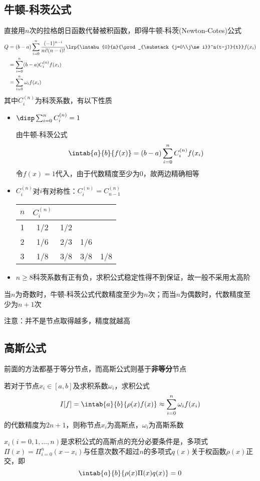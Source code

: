 \subsection{牛顿-科茨公式}
直接用$n$次的拉格朗日函数代替被积函数，即得牛顿-科茨(Newton-Cotes)公式
\[\begin{aligned}
    Q&=(b-a)\sum_{i=0}^n\frac{(-1)^{n-i}}{ni!(n-i)!}\lrp{\intabu{0}{n}{\prod_{\substack{j=0\\j\ne i}}^n(t-j)}{t}}f(x_i)\\
    &=\sum_{i=0}^n(b-a)C_i^{(n)} f(x_i)\\
    &=\sum_{i=0}^n\omega_if(x_i)
\end{aligned}\]
其中$C_i^{(n)}$为科茨系数，有以下性质
\begin{itemize}
    \item $\disp\sum_{i=0}^nC_{i}^{(n)}=1$
    \begin{analysis}
        由牛顿-科茨公式
        \[\intab{a}{b}{f(x)}=(b-a)\sum_{i=0}^nC_i^{(n)}f(x_i)\]
        令$f(x)=1$代入，由于代数精度至少为$0$，故两边精确相等
    \end{analysis}
    \item $C_i^{(n)}$对$i$有对称性：$C_i^{(n)}=C_{n-1}^{(n)}$
\begin{center}
\begin{tabular}{c|cccc}\hline
$n$ & $C_i^{(n)}$\\\hline
1 & 1/2 & 1/2 \\\hline
2 & 1/6 & 2/3 & 1/6\\\hline
3 & 1/8 & 3/8 & 3/8 & 1/8\\\hline
\end{tabular}
\end{center}
    \item $n\geq 8$科茨系数有正有负，求积公式稳定性得不到保证，故一般不采用太高阶
\end{itemize}
\begin{theorem}
    当$n$为奇数时，牛顿-科茨公式代数精度至少为$n$次；而当$n$为偶数时，代数精度至少为$n+1$次
\end{theorem}
注意：并不是节点取得越多，精度就越高

\subsection{高斯公式}
前面的方法都基于等分节点，而高斯公式则基于\textbf{非等分}节点
\begin{definition}
    若对于节点$x_i\in[a,b]$及求积系数$\omega_i$，求积公式
    \[I[f]=\intab{a}{b}{\rho(x)f(x)}\approx\sum_{i=0}^n\omega_if(x_i)\]
    的代数精度为$2n+1$，则称节点$x_i$为高斯点，$\omega_i$为高斯系数
\end{definition}
\begin{theorem}
    $x_i(i=0,1,\ldots,n)$是求积公式的高斯点的充分必要条件是，多项式$\Pi(x)=\Pi_{i=0}^n(x-x_i)$与任意次数不超过$n$的多项式$q(x)$关于权函数$\rho(x)$正交，即
    \[\intab{a}{b}{\rho(x)\Pi(x)q(x)}=0\]
\end{theorem}

